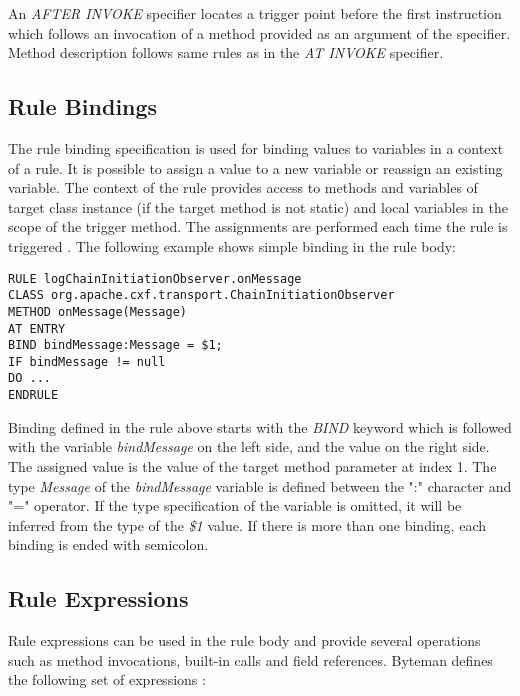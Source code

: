 \documentclass[12pt,oneside]{fithesis2}
\begin{document}
An \textit{AFTER INVOKE} specifier locates a trigger point before the first instruction which follows an invocation of a method provided as an argument of the specifier. Method description follows same rules as in the \textit{AT INVOKE} specifier.

\subsection{Rule Bindings}
The rule binding specification is used for binding values to variables in a context of a rule. It is possible to assign a value to a new variable or reassign an existing variable. The context of the rule provides access to methods and variables of target class instance (if the target method is not static) and local variables in the scope of the trigger method. The assignments are performed each time the rule is triggered \cite[Rule Bindings]{byteman_doc}. The following example shows simple binding in the rule body: 

\begin{lstlisting}[caption = Rule binding specification, label = rule_binding_code]
RULE logChainInitiationObserver.onMessage
CLASS org.apache.cxf.transport.ChainInitiationObserver
METHOD onMessage(Message)
AT ENTRY
BIND bindMessage:Message = $1;
IF bindMessage != null
DO ...
ENDRULE
\end{lstlisting}

Binding defined in the rule above starts with the \textit{BIND} keyword which is followed with the variable \textit{bindMessage} on the left side, and the value on the right side. The assigned value is the value of the target method parameter at index 1. The type \textit{Message} of the \textit{bindMessage} variable is defined between the ":" character and "=" operator. If the type specification of the variable is omitted, it will be inferred from the type of the \textit{\$1} value. If there is more than one binding, each binding is ended with semicolon.

\subsection{Rule Expressions}
\label{subsec:rule_exp}
Rule expressions can be used in the rule body and provide several operations such as method invocations, built-in calls and field references. Byteman defines the following set of expressions \cite[Rule Expressions]{byteman_doc}:
\end{document}
